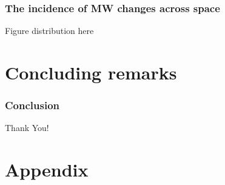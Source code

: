 \documentclass[aspectratio=169, t]{beamer}
\begin{document}
\begin{frame}
	\frametitle{The incidence of MW changes across space}
	
	Figure distribution here
\end{frame}

\section{Concluding remarks}

\begin{frame}
	\frametitle{Conclusion}
	
	
\end{frame}

\begin{frame}[c]
    \begin{center}
    	\Large Thank You!
    \end{center}
\end{frame}


\appendix

\renewcommand\thetable{\thesection.\arabic{table}} 
\renewcommand\thefigure{\thesection.\arabic{figure}} 
\setcounter{table}{0}
\setcounter{figure}{0}

\section{Appendix}
\end{document}
